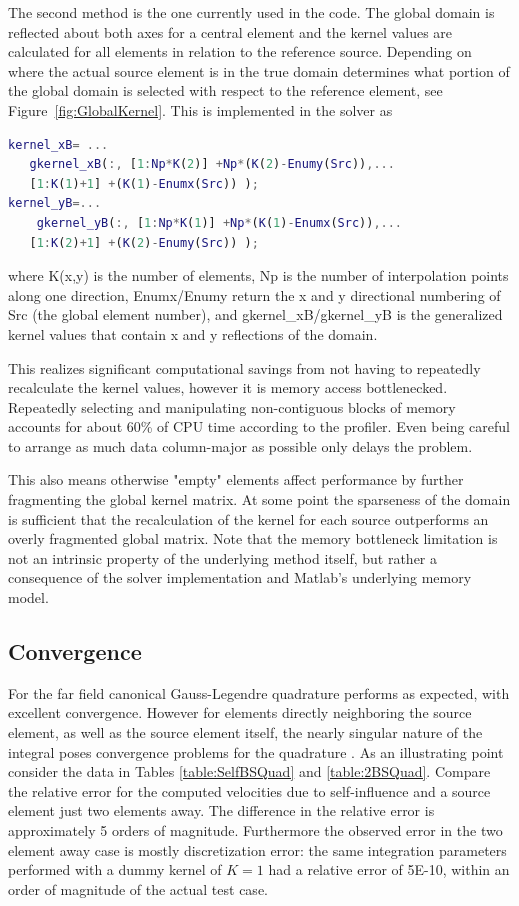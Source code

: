 \documentclass[letterpaper,12pt]{report}
\begin{document}
The second method is the one currently used in the code. The global domain is reflected about both axes for a central element and the kernel values are calculated for all elements in relation to the reference source. Depending on where the actual source element is in the true domain determines what portion of the global domain is selected with respect to the reference element, see Figure~\ref{fig:GlobalKernel}. This is implemented in the solver as

\singlespacing
\begin{lstlisting}[language=Matlab]
kernel_xB= ...
   gkernel_xB(:, [1:Np*K(2)] +Np*(K(2)-Enumy(Src)),...
   [1:K(1)+1] +(K(1)-Enumx(Src)) );
kernel_yB=...
    gkernel_yB(:, [1:Np*K(1)] +Np*(K(1)-Enumx(Src)),...
   [1:K(2)+1] +(K(2)-Enumy(Src)) );
\end{lstlisting}
\doublespacing

where K(x,y) is the number of elements, Np is the number of interpolation points along one direction, Enumx/Enumy return the x and y directional numbering of Src (the global element number), and gkernel\_xB/gkernel\_yB is the generalized kernel values that contain x and y reflections of the domain.

This realizes significant computational savings from not having to repeatedly recalculate the kernel values, however it is memory access bottlenecked. Repeatedly selecting and manipulating non-contiguous blocks of memory accounts for about 60\% of CPU time according to the profiler. Even being careful to arrange as much data column-major as possible only delays the problem.

This also means otherwise "empty" elements affect performance by further fragmenting the global kernel matrix. At some point the sparseness of the domain is sufficient that the recalculation of the kernel for each source outperforms an overly fragmented global matrix. Note that the memory bottleneck limitation is not an intrinsic property of the underlying method itself, but rather a consequence of the solver implementation and Matlab's underlying memory model.

\subsection{Convergence}
For the far field canonical Gauss-Legendre quadrature performs as expected, with excellent convergence. However for elements directly neighboring the source element, as well as the source element itself, the nearly singular nature of the integral poses convergence problems for the quadrature \cite{Strain1996}. As an illustrating point consider the data in Tables \ref{table:SelfBSQuad} and \ref{table:2BSQuad}. Compare the relative error for the computed velocities due to self-influence and a source element just two elements away. The difference in the relative error is approximately 5 orders of magnitude. Furthermore the observed error in the two element away case is mostly discretization error: the same integration parameters performed with a dummy kernel of $K=1$ had a relative error of 5E-10, within an order of magnitude of the actual test case.
\end{document}
